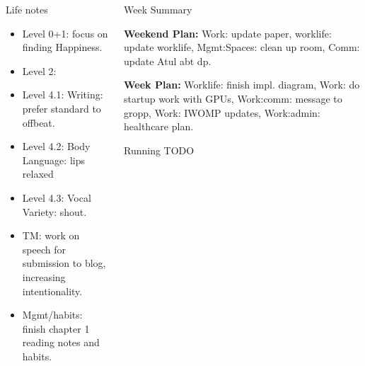\documentclass[serif, mathserif, final]{beamer}
\begin{document}
\begin{frame}{}
\begin{columns}
\begin{column}{0.25\linewidth}
      \begin{block}{Life notes} 
        \begin{itemize} 
          \tiny \item \tiny Level 0+1: focus on finding Happiness. 
        \item \tiny Level 2: 
        \item \tiny Level 4.1: Writing: prefer standard to offbeat. 
        \item \tiny Level 4.2: Body Language: lips relaxed
        \item \tiny Level 4.3: Vocal Variety: shout. 
        \item \tiny TM: work on speech for submission to blog, increasing intentionality. 
        \item \tiny Mgmt/habits: finish chapter 1 reading notes and habits. 
        \end{itemize}     
      \end{block}
    \end{column} %
    
    \begin{column}{0.50\linewidth}
      \begin{block}{Week Summary} 


        {\tiny \textbf{Weekend Plan:} Work: update paper,  worklife:
          update worklife, Mgmt:Spaces: clean up room, Comm: update
          Atul abt dp.} 

        {\tiny \textbf{Week Plan:}
          Worklife: finish impl. diagram,  Work: do startup work with
          GPUs, Work:comm: message to gropp, Work: IWOMP updates,
          Work:admin: healthcare plan.}

      \end{block}
      
      \begin{block}{Running TODO} %
        

\end{block}
\end{column}
\end{columns}
\end{frame}
\end{document}
